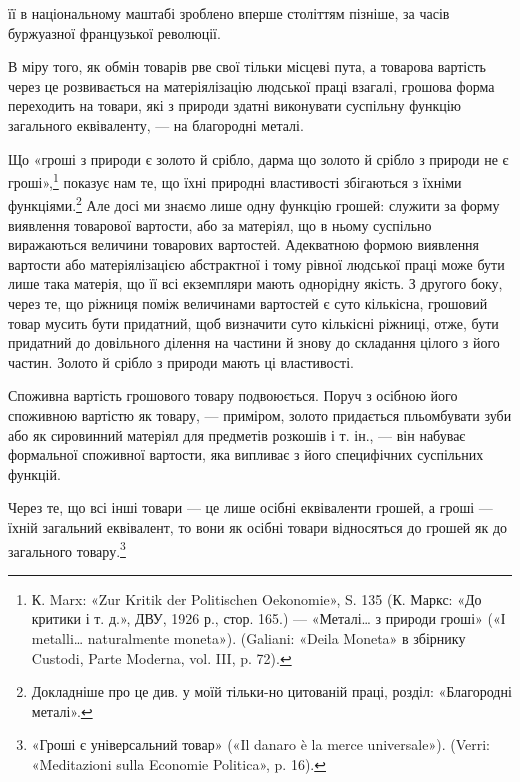 \parcont{}  %
її в національному маштабі зроблено вперше століттям пізніше,
за часів буржуазної французької революції.

В міру того, як обмін товарів рве свої тільки місцеві пута,
а товарова вартість через це розвивається на матеріялізацію
людської праці взагалі, грошова форма переходить на товари,
які з природи здатні виконувати суспільну функцію загального
еквіваленту, — на благородні металі.

Що «гроші з природи є золото й срібло, дарма що золото й
срібло з природи не є гроші»,\footnote{
К. Marx: «Zur Kritik der Politischen Oekonomie», S. 135 (К. Маркс:
«До критики і т. д.», ДВУ, 1926 р., стор. 165.) — «Металі\dots{} з природи
гроші» («І metalli\dots{} naturalmente moneta»). (Galiani: «Deila Moneta»
в збірнику Custodi, Parte Moderna, vol. III, p. 72).
} показує нам те, що їхні природні
властивості збігаються з їхніми функціями.\footnote{
Докладніше про це див. у моїй тільки-но цитованій праці, розділ:
«Благородні металі».
} Але досі
ми знаємо лише одну функцію грошей: служити за форму виявлення
товарової вартости, або за матеріял, що в ньому суспільно
виражаються величини товарових вартостей. Адекватною формою
виявлення вартости або матеріялізацією абстрактної і тому рівної
людської праці може бути лише така матерія, що її всі екземпляри
мають однорідну якість. З другого боку, через те, що ріжниця
поміж величинами вартостей є суто кількісна, грошовий товар
мусить бути придатний, щоб визначити суто кількісні ріжниці,
отже, бути придатний до довільного ділення на частини й знову
до складання цілого з його частин. Золото й срібло з природи
мають ці властивості.

Споживна вартість грошового товару подвоюється. Поруч з
осібною його споживною вартістю як товару, — приміром, золото
придається пльомбувати зуби або як сировинний матеріял
для предметів розкошів і т. ін., — він набуває формальної споживної
вартости, яка випливає з його специфічних суспільних
функцій.

Через те, що всі інші товари — це лише осібні еквіваленти
грошей, а гроші — їхній загальний еквівалент, то вони як осібні
товари відносяться до грошей як до загального товару.\footnote{
«Гроші є універсальний товар» («Il danaro è la merce universale»).
(Verri: «Meditazioni sulla Economie Politica», p. 16).
}

